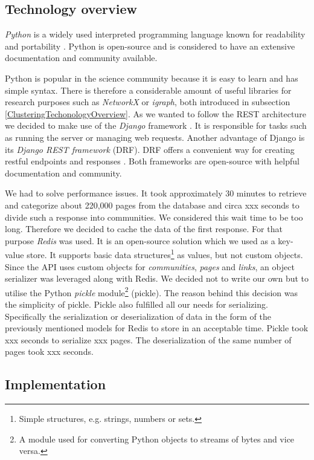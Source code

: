 \subsection{Technology overview}
\label{technologyOverwiew}
\textit{Python} is a widely used interpreted programming language known for readability and portability \cite{aboutPython}. Python is open-source and is considered to have an extensive documentation and community available. 

Python is popular in the science community because it is easy to learn and has simple syntax. There is therefore a considerable amount of useful libraries for research purposes such as \textit{NetworkX} or \textit{igraph}, both introduced in subsection \ref{ClusteringTechonologyOverview}.  
As we wanted to follow the REST architecture we decided to make use of the \textit{Django} framework \cite{meetDjango}. It is responsible for tasks such as running the server or managing web requests. Another advantage of Django is its \textit{Django REST framework} (DRF). DRF offers a convenient way for creating restful endpoints and responses \cite{djangoRest}. Both frameworks are open-source with helpful documentation and community. 

We had to solve performance issues. It took approximately 30 minutes to retrieve and categorize about 220,000 pages from the database and circa xxx seconds to divide such a response into communities. We considered this wait time to be too long. Therefore we decided to cache the data of the first response. For that purpose \textit{Redis} \cite{redis} was used. It is an open-source solution which we used as a key-value store. It supports basic data structures\footnote{Simple structures, e.g. strings, numbers or sets.} as values, but not custom objects. Since the API uses custom objects for \textit{communities}, \textit{pages} and \textit{links}, an object serializer was leveraged along with Redis. We decided not to write our own but to utilise the Python \textit{pickle} module\footnote{A module used for converting Python objects to streams of bytes and vice versa.} \cite{pickle} (pickle). The reason behind this decision was the simplicity of pickle. Pickle also fulfilled all our needs for serializing. Specifically the serialization or deserialization of data in the form of the previously mentioned models for Redis to store in an acceptable time. Pickle took xxx seconds to serialize xxx pages. The deserialization of the same number of pages took xxx seconds.

\subsection{Implementation} \label{APIImplementation}


